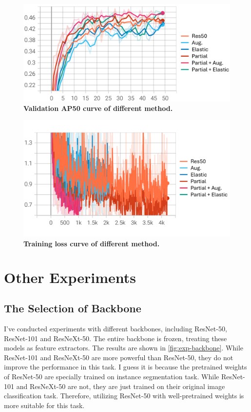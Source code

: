 \documentclass[10pt,twocolumn,letterpaper]{article}
\begin{document}
\begin{figure}[h]
  \centering
  \includegraphics[width=0.95\linewidth]{assets/val_ap50.png}
  \caption{\textbf{Validation AP50 curve of different method.}}
  \label{fig:val-ap50}
\end{figure}

\begin{figure}[h]
  \centering
  \includegraphics[width=0.95\linewidth]{assets/train_loss.png}
  \caption{\textbf{Training loss curve of different method.}}
  \label{fig:train-loss}
\end{figure}


\section*{Other Experiments}
\label{sec:other-exp}

\subsection*{The Selection of Backbone}

I've conducted experiments with different backbones, including ResNet-50,
ResNet-101 and ResNeXt-50. The entire backbone is frozen, treating these
models as feature extractors. The results are shown in \cref{fig:exp-backbone}.
While ResNet-101 and ResNeXt-50 are more powerful than ResNet-50, they do not
improve the performance in this task. I guess it is because the pretrained
weights of ResNet-50 are specially trained on instance segmentation task. While
ResNet-101 and ResNeXt-50 are not, they are just trained on their original image
classification task. Therefore, utilizing ResNet-50 with well-pretrained weights
is more suitable for this task.
\end{document}
